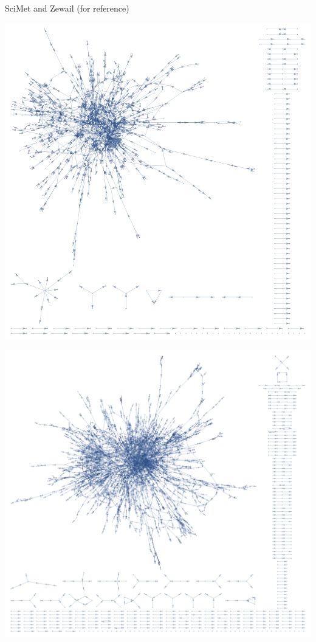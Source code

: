 \documentclass[xcolor=dvipsnames, 14pt]{beamer}
\begin{document}
\begin{frame}{SciMet and Zewail (for reference)}
\centering
\begin{minipage}{0.47\linewidth}
\includegraphics[width=\textwidth]{display_sciMet.png}
\end{minipage}\hfill
\begin{minipage}{0.47\linewidth}
\includegraphics[width=\textwidth]{display_zewail.png}
\end{minipage}
\end{frame}
\end{document}
